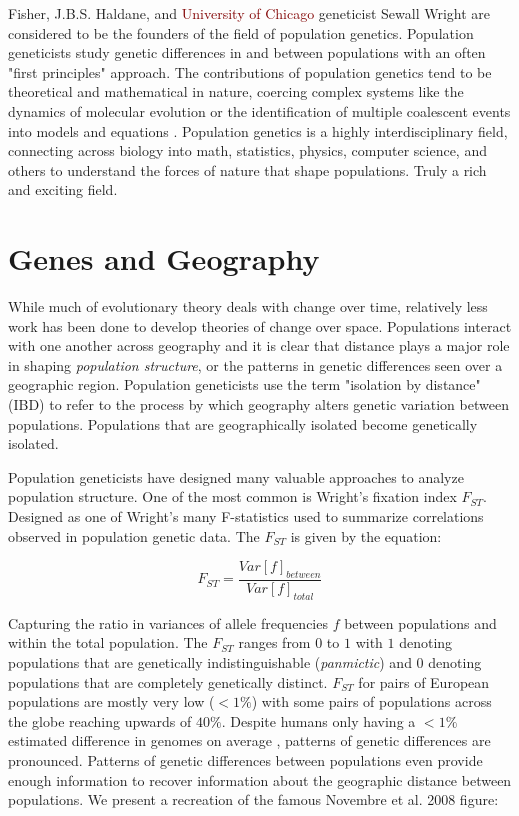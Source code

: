 Fisher, J.B.S. Haldane, and \textcolor{maroon}{University of Chicago} geneticist Sewall Wright are considered to be the founders of the field of population genetics. Population geneticists study genetic differences in and between populations with an often "first principles" approach. The contributions of population genetics tend to be theoretical and mathematical in nature, coercing complex systems like the dynamics of molecular evolution or the identification of multiple coalescent events into models and equations \cite{rice_2016} \cite{rice_2018}. Population genetics is a highly interdisciplinary field, connecting across biology into math, statistics, physics, computer science, and others to understand the forces of nature that shape populations. Truly a rich and exciting field. \cite{gillespie}

\section{Genes and Geography}
While much of evolutionary theory deals with change over time, relatively less work has been done to develop theories of change over space. Populations interact with one another across geography and it is clear that distance plays a major role in shaping \textit{population structure}, or the patterns in genetic differences seen over a geographic region. Population geneticists use the term "isolation by distance" (IBD) to refer to the process by which geography alters genetic variation between populations. Populations that are geographically isolated become genetically isolated. \cite{rohlf_1971} \cite{slatkin_1993} 


Population geneticists have designed many valuable approaches to analyze population structure. One of the most common is Wright's fixation index $F_{ST}$. Designed as one of Wright's many F-statistics used to summarize correlations observed in population genetic data. The $F_{ST}$ is given by the equation:

\begin{equation}
    F_{ST} = \frac{Var[f]_{between}}{Var[f]_{total}}
\end{equation}

Capturing the ratio in variances of allele frequencies $f$ between populations and within the total population. The $F_{ST}$ ranges from $0$ to $1$ with $1$ denoting populations that are genetically indistinguishable (\textit{panmictic}) and $0$ denoting populations that are completely genetically distinct. $F_{ST}$ for pairs of European populations are mostly very low ($ < 1\%$) \cite{sforza_1994} with some pairs of populations across the globe reaching upwards of $40\%$. Despite humans only having a $ < 1\%$ estimated difference in genomes on average \cite{1k_genomes}, patterns of genetic differences are pronounced. Patterns of genetic differences between populations even provide enough information to recover information about the geographic distance between populations. We present a recreation of the famous Novembre et al. 2008 figure:

